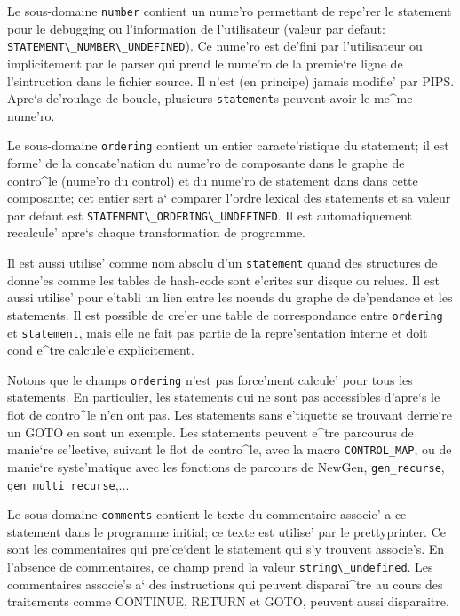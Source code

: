 Le sous-domaine \verb/number/ contient un nume'ro permettant de repe'rer
le statement pour le debugging ou l'information de l'utilisateur (valeur
par defaut: \verb+STATEMENT\_NUMBER\_UNDEFINED+). Ce nume'ro est de'fini
par l'utilisateur ou implicitement par le parser qui prend le nume'ro de
la premie`re ligne de l'sintruction dans le fichier source. Il n'est (en
principe) jamais modifie' par PIPS. Apre`s de'roulage de boucle,
plusieurs \verb/statement/s peuvent avoir le me^me nume'ro.

Le sous-domaine \verb/ordering/ contient un entier caracte'ristique du
statement; il est forme' de la concate'nation du nume'ro de composante
dans le graphe de contro^le (nume'ro du control) et du nume'ro de
statement dans dans cette composante; cet entier sert a` comparer
l'ordre lexical des statements et sa valeur par defaut est
\verb+STATEMENT\_ORDERING\_UNDEFINED+. Il est automatiquement recalcule'
apre`s chaque transformation de programme. 

Il est aussi utilise' comme nom absolu d'un \verb/statement/ quand des
structures de donne'es comme les tables de hash-code sont e'crites sur
disque ou relues. Il est aussi utilise' pour e'tabli un lien entre les
noeuds du graphe de de'pendance et les statements. Il est possible de
cre'er une table de correspondance entre \verb/ordering/ et
\verb/statement/, mais elle ne fait pas partie de la repre'sentation
interne et doit cond e^tre calcule'e explicitement.

Notons que le champs \verb/ordering/ n'est pas force'ment calcule' pour
tous les statements. En particulier, les statements qui ne sont pas
accessibles d'apre`s le flot de contro^le n'en ont pas. Les statements
sans e'tiquette se trouvant derrie`re un GOTO en sont un exemple. Les
statements peuvent e^tre parcourus de manie`re se'lective, suivant le
flot de contro^le, avec la macro \verb/CONTROL_MAP/, ou de manie`re
syste'matique avec les fonctions de parcours de NewGen,
\verb/gen_recurse/,
\verb/gen_multi_recurse/,...

Le sous-domaine {\tt comments} contient le texte du commentaire associe'
a ce statement dans le programme initial; ce texte est utilise' par le
prettyprinter. Ce sont les commentaires qui pre'ce`dent le statement
qui s'y trouvent associe's. En l'absence de commentaires, ce champ
prend la valeur \verb/string\_undefined/. Les commentaires associe's a`
des instructions qui peuvent disparai^tre au cours des traitements comme
CONTINUE, RETURN et GOTO, peuvent aussi disparaitre.

